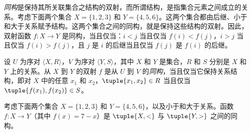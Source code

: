 \documentclass[../../../include/open-logic-section]{subfiles}
\begin{document}

\begin{explain}
\emph{同构}是保持其所关联集合之结构的双射，而所谓结构，是指集合元素之间成立的关系。考虑下面两个集合 $X=\{1,2,3\}$ 和 $Y=\{4,5,6\}$。这两个集合都由后继、小于和大于关系赋予结构。这两个集合之间的同构，就是保持这些结构的双射。因此，双射函数 $f \colon X \to Y$ 是同构，当且仅当：$i<j$ 当且仅当 $f(i)<f(j)$，$i>j$ 当且仅当 $f(i)>f(j)$，且 $j$ 是 $i$ 的后继当且仅当 $f(j)$ 是 $f(i)$ 的后继。
\end{explain}

\begin{defn}[同构]
设 $U$ 为序对 $\langle X, R\rangle$，$V$ 为序对 $\langle Y, S\rangle$，其中 $X$ 和 $Y$ 是集合，$R$ 和 $S$ 分别是 $X$ 和 $Y$ 上的关系。从 $X$ 到 $Y$ 的双射 $f$ 是从 $U$ 到 $V$ 的\emph{同构}，当且仅当它保持关系结构，即对 $X$ 中的任意 $x_{1}$ 和 $x_{2}$，$\tuple{x_1,x_2} \in R$ 当且仅当 $\tuple{f(x_1),f(x_2)} \in S$。
\end{defn}

\begin{ex}
考虑下面两个集合 $X=\{1,2,3\}$ 和 $Y=\{4,5,6\}$，以及小于和大于关系。函数 $f\colon X \to Y$（其中 $f(x) = 7-x$）是 $\tuple{X,<}$ 与 $\tuple{Y,>}$ 之间的同构。
\end{ex}
\end{document}

